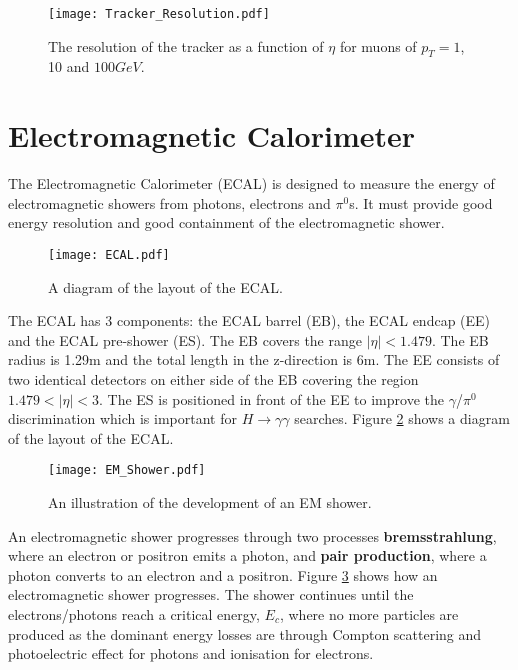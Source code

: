 \begin{figure}
\texttt{[image: Tracker\_Resolution.pdf]}
\caption{The resolution of the tracker as a function of $\eta$ for muons of
$p_{T} = 1$, 10 and $100 \unit{GeV}$.}
\label{fig:tracker_resolution}
\end{figure}

\section{Electromagnetic Calorimeter}

The Electromagnetic Calorimeter (ECAL) is designed to measure the energy of
electromagnetic showers from photons, electrons and $\pi^{0}$s. It must provide
good energy resolution and good containment of the electromagnetic shower. \\

\begin{figure}
\begin{center}
\texttt{[image: ECAL.pdf]}
\end{center}
\caption{A diagram of the layout of the ECAL.}
\label{fig:ECAL}
\end{figure}

The ECAL has 3 components: the ECAL barrel (EB), the ECAL endcap (EE) and the
ECAL pre-shower (ES). The EB covers the range $|\eta| < 1.479$. The EB radius is
1.29m and the total length in the z-direction is 6m. The EE consists of two 
identical detectors on either side of the EB covering the region $1.479 < |\eta|
< 3$. The ES is positioned in front of the EE to improve the $\gamma$/$\pi^{0}$ 
discrimination which is important for $H\rightarrow\gamma\gamma$ searches. 
Figure \ref{fig:ECAL} shows a diagram of the layout of the ECAL. \\

\begin{figure}
\begin{center}
\texttt{[image: EM\_Shower.pdf]}
\end{center}
\caption{An illustration of the development of an EM shower.}
\label{fig:em_shower}
\end{figure}

An electromagnetic shower progresses through two processes {\bf bremsstrahlung},
where an electron or positron emits a photon, and {\bf pair production}, where a
photon converts to an electron and a positron. Figure \ref{fig:em_shower} shows
how an electromagnetic shower progresses. The shower continues until the
electrons/photons reach a critical energy, $E_{c}$, where no more particles are 
produced as the dominant energy losses are through Compton scattering and
photoelectric effect for photons and ionisation for electrons. \\

